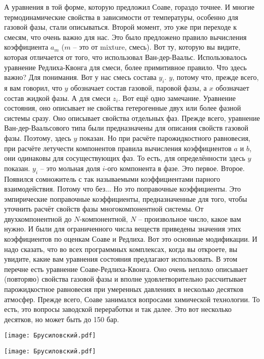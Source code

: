 \documentclass[main.tex]{subfiles}
\begin{document}
А уравнения в той форме, которую предложил Соаве, гораздо точнее.
И многие термодинамические свойства в зависимости от температуры, особенно для газовой фазы, стали описываться.
Второй момент, это уже при переходе к смесям, что очень важно для нас.
Это было предложено правило вычисления коэффициента $a_m$ ($m$ -- это от mixture, смесь).
Вот ту, которую вы видите, которая отличается от того, что использовал Ван-дер-Ваальс.
Использовалось уравнение Редлиха-Квонга для смеси, более примитивное правило.
Что здесь важно?
Для понимания.
Вот у нас смесь состава $y_i$.
$y$, потому что, прежде всего, я вам говорил, что $y$ обозначает состав газовой, паровой фазы, а $x$ обозначает состав жидкой фазы.
А для смеси $z_i$.
Вот ещё одно замечание.
Уравнение состояния, оно описывает не свойства гетерогенные двух или более фазной системы сразу.
Оно описывает свойства отдельных фаз.
Прежде всего, уравнение Ван-дер-Ваальсового типа были предназначены для описания свойств газовой фазы.
Поэтому, здесь $y$ показан.
Но при расчёте парожидкостного равновесия, при расчёте летучести компонентов правила вычисления коэффициентов $a$ и $b$, они одинаковы для сосуществующих фаз.
То есть, для определённости здесь $y$ показан.
$y_i$ -- это мольная доля $i$-ого компонента в фазе.
Это первое.
Второе.
Появился сомножитель  с так называемыми коэффициентами парного взаимодействия.
Потому что без...
Но это поправочные коэффициенты.
Это эмпирические поправочные коэффициенты, предназначенные для того, чтобы уточнить расчёт свойств фазы многокомпонентной системы.
От двухкомпонентной до $N$-компонентной, $N$ -- произвольное число, какое вам нужно.
И были для ограниченного числа веществ приведены значения этих коэффициентов по оценкам Соаве и Редлиха.
Вот это основные модификации.
И надо сказать, что во всех программных комплексах, когда вы откроете, вы увидите, какие вам уравнения состояния предлагают использовать.
В этом перечне есть уравнение Соаве-Редлиха-Квонга.
Оно очень неплохо описывает (повторяю) свойства газовой фазы и вполне удовлетворительно рассчитывает парожидкостное равновесия при умеренных давлениях в несколько десятков атмосфер.
Прежде всего, Соаве занимался вопросами химической технологии.
То есть, это вопросы заводской переработки и так далее.
Это вот несколько десятков, но может быть до 150 бар.

\begin{center}
\texttt{[image: Брусиловский.pdf]}
\end{center}

\begin{center}
\texttt{[image: Брусиловский.pdf]}
\end{center}
\end{document}

